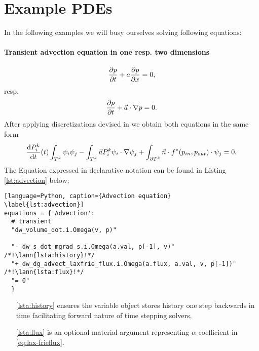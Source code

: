\section{Example PDEs}
In the following examples we will busy ourselves solving following equations:\\
\paragraph{Transient advection equation in one resp. two dimensions}
\begin{equation}
    \label{eq:ex_advection}
    \frac{\partial p}{\partial t} + a\frac{\partial p}{\partial x} = 0,
\end{equation}
resp.
\begin{equation}
    \frac{\partial p}{\partial t} + \vec{a}\cdot\nabla{p} = 0.
\end{equation}
After applying discretizations devised in  we obtain both
equations in the same form
\begin{equation}
         \frac{\text{d}P^k_i}{\text{d}t}(t)\int_{T^k}\psi_i\psi_j
         - \int_{T^k} \vec{a}P_i^k\psi_i\cdot\nabla\psi_j
         + \int_{\partial{T^k}} \vec{n}
        \cdot f^{*} (p_{in}, p_{out})\cdot\psi_j = 0.
\end{equation}
The Equation expressed in \sfepy{} declarative notation can be found in Listing
\ref{lst:advection} below;
\setcounter{lstannotation}{0}
\begin{lstlisting}[language=Python, caption={Advection equation}
\label{lst:advection}]
equations = {'Advection':
  # transient
  "dw_volume_dot.i.Omega(v, p)"

  "- dw_s_dot_mgrad_s.i.Omega(a.val, p[-1], v)" /*!\lann{lsta:history}!*/
  "+ dw_dg_advect_laxfrie_flux.i.Omega(a.flux, a.val, v, p[-1])"  /*!\lann{lsta:flux}!*/
  "= 0"
  }
\end{lstlisting}
\begin{itemize}
    \item[\ref{lsta:history}]  ensures the variable object
    stores history one step backwards in time facilitating forward nature of
    time stepping solvers,
    \item[\ref{lsta:flux}]  is an optional material argument
    representing $\alpha$ coefficient in \eqref{eq:lax-frieflux}.
\end{itemize}

